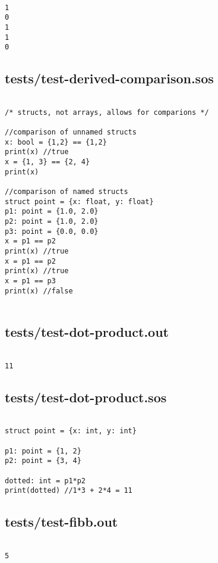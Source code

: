 \documentclass[main.tex]{subfiles}
\begin{document}
\begin{lstlisting}

1
0
1
1
0
\end{lstlisting}

\subsection{tests/test-derived-comparison.sos}

\begin{lstlisting}

/* structs, not arrays, allows for comparions */

//comparison of unnamed structs
x: bool = {1,2} == {1,2}
print(x) //true
x = {1, 3} == {2, 4}
print(x)

//comparison of named structs
struct point = {x: float, y: float}
p1: point = {1.0, 2.0}
p2: point = {1.0, 2.0}
p3: point = {0.0, 0.0}
x = p1 == p2
print(x) //true
x = p1 == p2
print(x) //true
x = p1 == p3
print(x) //false


\end{lstlisting}

\subsection{tests/test-dot-product.out}

\begin{lstlisting}

11
\end{lstlisting}

\subsection{tests/test-dot-product.sos}

\begin{lstlisting}

struct point = {x: int, y: int}

p1: point = {1, 2}
p2: point = {3, 4}

dotted: int = p1*p2
print(dotted) //1*3 + 2*4 = 11
\end{lstlisting}

\subsection{tests/test-fibb.out}

\begin{lstlisting}

5
\end{lstlisting}
\end{document}
